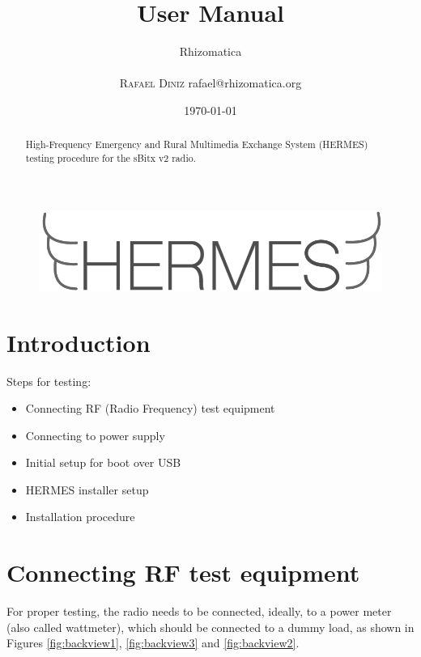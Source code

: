 \documentclass[11pt,a4paper]{article}
\title{User Manual}
\author{
       \large
       \mbox{Rhizomatica} \\
       \mbox{}\\ 
       \textsc{Rafael Diniz}
        rafael@rhizomatica.org\\
}
\date{\today}
\begin{document}
\maketitle

\begin{figure}[!ht]
\includegraphics[width=1\textwidth]{pictures/logoh.png}
\end{figure}

\begin{abstract}

  High-Frequency Emergency and Rural Multimedia Exchange System (HERMES) testing procedure for the sBitx v2 radio.

\end{abstract}

\newpage

\tableofcontents

\setlength{\parindent}{0em}
\setlength{\parskip}{1em}

\section{Introduction}

Steps for testing:

\begin{itemize}
\item Connecting RF (Radio Frequency) test equipment
\item Connecting to power supply
\item Initial setup for boot over USB
\item HERMES installer setup
\item Installation procedure
\end{itemize}


\section{Connecting RF test equipment}

For proper testing, the radio needs to be connected, ideally, to a power meter (also called wattmeter), which should be connected to a dummy load, as shown in Figures \ref{fig:backview1}, \ref{fig:backview3}
and \ref{fig:backview2}.
\end{document}
